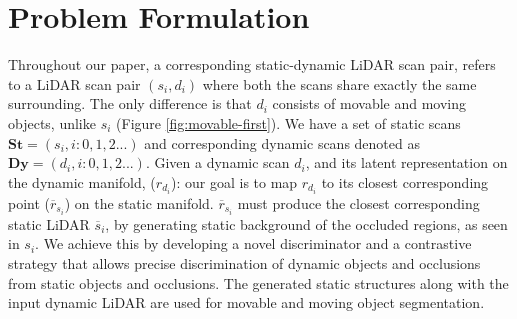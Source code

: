 \section{Problem Formulation}

    Throughout our paper, a corresponding static-dynamic LiDAR scan pair, refers to a LiDAR scan pair $(s_i, d_i)$ where both the scans share exactly the same surrounding. The only difference is that $d_i$ consists of movable and moving objects, unlike $s_i$ (Figure \ref{fig:movable-first}). We have a set of static scans $\textbf{St}=(s_i, i: 0,1,2...)$ and corresponding dynamic scans denoted as $\textbf{Dy}=(d_i, i: 0,1,2...)$. Given a dynamic scan $d_i$, and its latent representation on the dynamic manifold, ($r_{d_i}$): our goal is to map $r_{d_i}$  to its closest corresponding point ($\overline{r}_{s_i}$) on the static manifold. $\overline{r}_{s_i}$ must produce the closest corresponding static LiDAR $\overline{s}_{i}$, by generating static background of the occluded regions, as seen in $s_i$. We achieve this by developing a novel discriminator and a contrastive strategy that allows precise discrimination of dynamic objects and occlusions from static objects and occlusions. The generated static structures along with the input dynamic LiDAR are used for movable and moving object segmentation.
